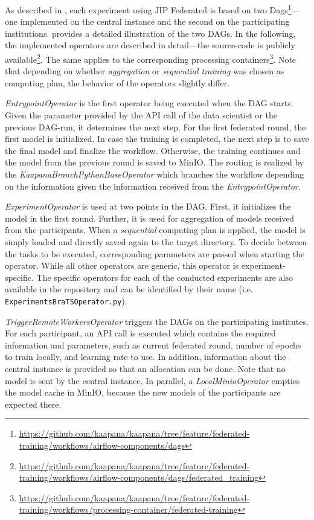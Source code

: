 As described in , each experiment using JIP Federated is based on two Dags\footnote{\url{https://github.com/kaapana/kaapana/tree/feature/federated-training/workflows/airflow-components/dags}}---one implemented on the central instance and the second on the participating institutions.  provides a detailed illustration of the two DAGs.
In the following, the implemented operators are described in detail---the source-code is publicly available\footnote{\url{https://github.com/kaapana/kaapana/tree/feature/federated-training/workflows/airflow-components/dags/federated_training}}.
The same applies to the corresponding processing containers\footnote{\url{https://github.com/kaapana/kaapana/tree/feature/federated-training/workflows/processing-container/federated-training}}.
Note that depending on whether \textit{aggregation} or \textit{sequential training} was chosen as computing plan, the behavior of the operators slightly differ.

\textit{EntrypointOperator} is the first operator being executed when the DAG starts. Given the parameter provided by the API call of the data scientist or the previous DAG-run, it determines the next step. 
For the first federated round, the first model is initialized. In case the training is completed, the next step is to save the final model and finalize the workflow.
Otherwise, the training continues and the model from the previous round is saved to MinIO.
The routing is realized by the \textit{KaapanaBranchPythonBaseOperator} which branches the workflow depending on the information given the information received from the \textit{EntrypointOperator}.

\textit{ExperimentOperator} is used at two points in the DAG. First, it initializes the model in the first round. Further, it is used for aggregation of models received from the participants. When a \textit{sequential} computing plan is applied, the model is simply loaded and directly saved again to the target directory.
To decide between the tasks to be executed, corresponding parameters are passed when starting the operator.
While all other operators are generic, this operator is experiment-specific. The specific operators for each of the conducted experiments are also available in the repository and can be identified by their name (i.e. \verb|ExperimentsBraTSOperator.py|).

\textit{TriggerRemoteWorkersOperator} triggers the DAGs on the participating institutes. For each participant, an API call is executed which contains the required information and parameters, such as current federated round, number of epochs to train locally, and learning rate to use. In addition, information about the central instance is provided so that an allocation can be done. Note that no model is sent by the central instance.
In parallel, a \textit{LocalMinioOperator} empties the model cache in MinIO, because the new models of the participants are expected there.

